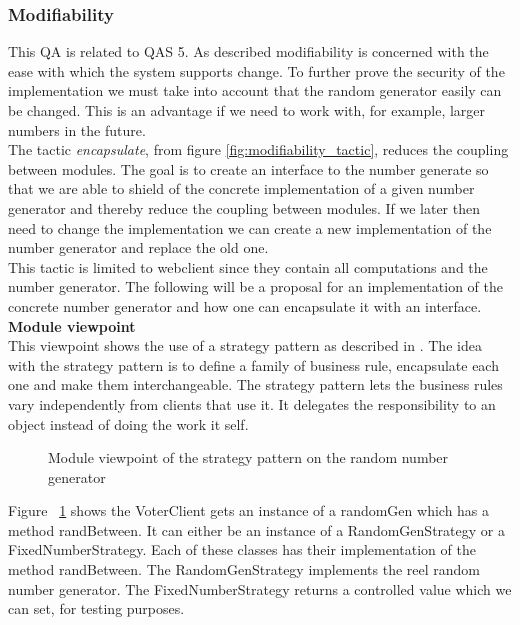 \subsubsection{Modifiability} \label{sec:modifiability_random_generator}
This QA is related to QAS 5.  As described modifiability is concerned with the ease with which the system supports change. To further prove the security of the implementation we must take into account that the random generator easily can be changed. This is an advantage if we need to work with, for example, larger numbers in the future. \\ 


\noindent
The tactic \textit{encapsulate}, from figure \ref{fig:modifiability_tactic}, reduces the coupling between modules. The goal is to create an interface to the number generate so that we are able to shield of the concrete implementation of a given number generator and thereby reduce the coupling between modules. If  we later then need to change the implementation we can create a new implementation of the number generator and  replace the old one. \\





\noindent
This tactic is limited to webclient since they contain all computations and the number generator. The following will be a proposal for an implementation of the concrete number generator and how one can encapsulate it with an interface.\\


\noindent
\textbf{Module viewpoint}\\
This viewpoint shows the use of a strategy pattern as described in \cite{Baerbak10}. The idea with the strategy pattern is to define a family of business rule, encapsulate each one and make them interchangeable. The strategy pattern lets the business rules vary independently from clients that use it. It delegates the responsibility to an object instead of doing the work it self. 



\begin{figure}[H]
\centering
  \caption{Module viewpoint of the strategy pattern on the random number generator} 
  \label{fig:the_random_number_generator}
\end{figure}


\noindent
Figure ~\ref{fig:the_random_number_generator}  shows the VoterClient gets an instance of a randomGen which has a method randBetween. It can either be an instance of a RandomGenStrategy or a FixedNumberStrategy. Each of these classes has their implementation of the method randBetween. The RandomGenStrategy implements the reel random number generator. The FixedNumberStrategy returns a controlled value which we can set, for testing purposes.\\

